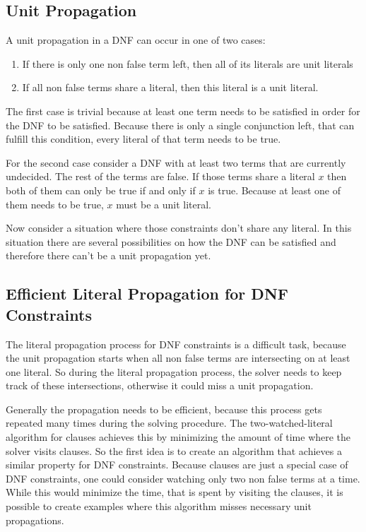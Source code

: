 \subsection{Unit Propagation}
A unit propagation in a DNF can occur in one of two cases:
\begin{leftbar}
\begin{enumerate}
\item If there is only one non false term left, then all of its literals are unit literals
\item If all non false terms share a literal, then this literal is a unit literal.
\end{enumerate}
\end{leftbar}
The first case is trivial because at least one term needs to be satisfied in order for the DNF to be satisfied. Because there is only a single conjunction left, that can fulfill this condition, every literal of that term needs to be true.
\par
For the second case consider a DNF with at least two terms that are currently undecided. The rest of the terms are false. If those terms share a literal $x$ then both of them can only be true if and only if $x$ is true. Because at least one of them needs to be true, $x$ must be a unit literal.
\par
Now consider a situation where those constraints don't share any literal. In this situation there are several possibilities on how the DNF can be satisfied and therefore there can't  be a unit propagation yet.

\subsection{Efficient Literal Propagation for DNF Constraints}

The literal propagation process for DNF constraints is a difficult task, because the unit propagation starts when all non false terms are intersecting on at least one literal. So during the literal propagation process, the solver needs to keep track of these intersections, otherwise it could miss a unit propagation. 

Generally the propagation needs to be efficient, because this process gets repeated many times during the solving procedure. The two-watched-literal algorithm for clauses achieves this by minimizing the amount of time where the solver visits clauses. So the first idea is to create an algorithm that achieves a similar property for DNF constraints. Because clauses are just a special case of DNF constraints, one could consider watching only two non false terms at a time. While this would minimize the time, that is spent by visiting the clauses, it is possible to create examples where this algorithm misses necessary unit propagations.

